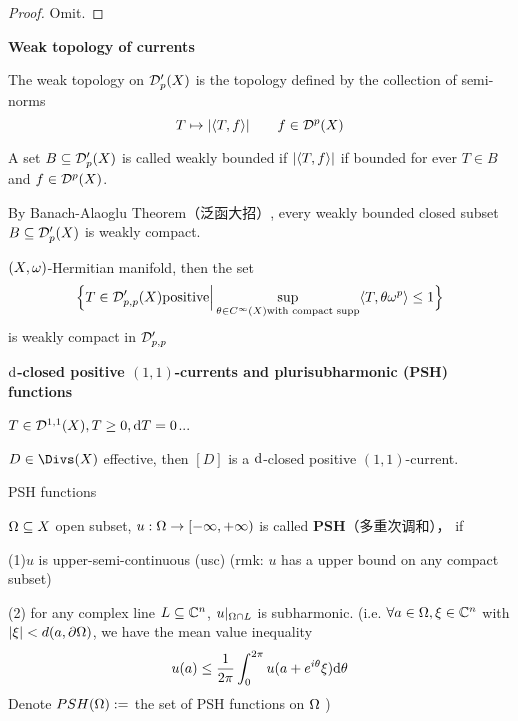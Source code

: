 \begin{proof}
Omit.
\end{proof}

\textbf{Weak topology of currents}

\begin{definition}
The weak topology on $\mathcal{D}'_p(X)$ is the
topology defined by the collection of semi-norms
$$
  T\mapsto |\langle T,f \rangle|
  \qquad
  f\in\mathcal{D}^p(X)
$$
\end{definition}

\begin{definition}
A set $B\subseteq\mathcal{D}_p'(X)$ is called
weakly bounded if
$|\langle T,f \rangle|$ if bounded for ever $T\in B$ and $f\in\mathcal{D}^p(X)$.
\end{definition}

\begin{rem}
By Banach-Alaoglu Theorem（泛函大招）,
every weakly bounded closed subset $B\subseteq \mathcal{D}'_p(X)$
is weakly compact.
\end{rem}

\begin{thm}
$(X,\omega)$-Hermitian manifold, then
the set
$$\Big\{ T\in\mathcal{D}'_{p,p}(X)\text{positive} \Big| \sup_{\theta\in C^\infty(X)\text{with compact supp}}
           \langle T,\theta\omega^p \rangle\leq 1 \Big\}
$$
is weakly compact in $\mathcal{D}'_{p,p}$
\end{thm}

\textbf{$\mathrm{d}$-closed positive $(1,1)$-currents and plurisubharmonic (PSH) functions }

$T\in\mathcal{D}^{1,1}(X),T\geq 0,\mathrm{d} T=0$...

\begin{example}
$D\in\Divs(X)$ effective, then $[D]$ is a $\mathrm{d}$-closed
positive $(1,1)$-current.
\end{example}

PSH functions

\begin{definition}
  $\Omega\subseteq X$ open subset, $u:\Omega\to[-\infty,+\infty)$
is called \textbf{PSH}（多重次调和）， if

(1)$u$ is upper-semi-continuous (usc)
(rmk: $u$ has a upper bound on any compact subset)

(2) for any complex line $L\subseteq\mathbb{C}^n$,
$u|_{\Omega\cap L}$ is subharmonic.
(i.e. $\forall a\in\Omega,\xi\in\mathbb{C}^n$ with $|\xi|<d(a,\partial\Omega)$,
we have the mean value inequality
$$
  u(a)\leq\frac{1}{2\pi}
  \int_{0}^{2\pi}
    u(a+e^{i\theta}\xi)\mathrm{d} \theta
$$
Denote $PSH(\Omega):=$ the set of PSH functions on $\Omega$
)
\end{definition}


